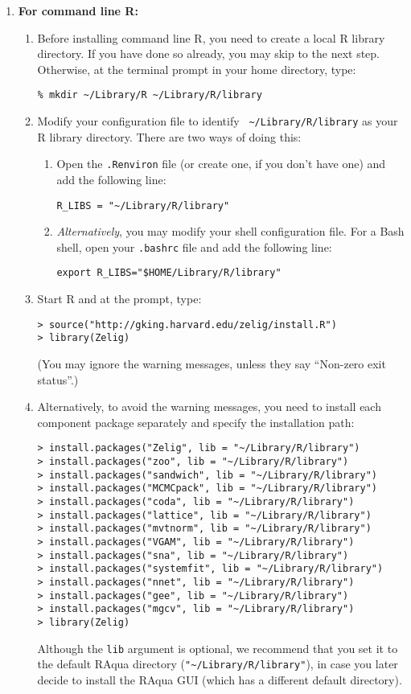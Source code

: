 \documentclass{article}
\begin{document}
\begin{enumerate}
\item {\bf For command line R:} 
  \begin{enumerate}
  \item Before installing command line R, you need to create a local R
    library directory.  If you have done so already, you may skip to
    the next step.  Otherwise, at the terminal prompt in your home
    directory, type:
\begin{verbatim}
% mkdir ~/Library/R ~/Library/R/library
\end{verbatim}
  \item Modify your configuration file to identify {\tt
      \~{}/Library/R/library} as your R library directory.  There are
    two ways of doing this:
    \begin{enumerate}
    \item Open the {\tt .Renviron} file (or create one, if you don't
      have one) and add the following line:
\begin{verbatim} 
R_LIBS = "~/Library/R/library"
\end{verbatim}
    \item {\it Alternatively}, you may modify your shell configuration
      file.  For a Bash shell, open your {\tt .bashrc} file and add
      the following line:
\begin{verbatim}
export R_LIBS="$HOME/Library/R/library"
\end{verbatim} %
      \end{enumerate}
    \item Start R and at the prompt, type:
\begin{verbatim}
> source("http://gking.harvard.edu/zelig/install.R")
> library(Zelig)
\end{verbatim}
(You may ignore the warning messages, unless they say ``Non-zero exit 
status''.)
\item Alternatively, to avoid the warning messages, you need to install 
each component package separately and specify the installation path:
\begin{verbatim}
> install.packages("Zelig", lib = "~/Library/R/library")
> install.packages("zoo", lib = "~/Library/R/library")
> install.packages("sandwich", lib = "~/Library/R/library")
> install.packages("MCMCpack", lib = "~/Library/R/library")
> install.packages("coda", lib = "~/Library/R/library")
> install.packages("lattice", lib = "~/Library/R/library")
> install.packages("mvtnorm", lib = "~/Library/R/library")
> install.packages("VGAM", lib = "~/Library/R/library")
> install.packages("sna", lib = "~/Library/R/library")
> install.packages("systemfit", lib = "~/Library/R/library")
> install.packages("nnet", lib = "~/Library/R/library")
> install.packages("gee", lib = "~/Library/R/library")
> install.packages("mgcv", lib = "~/Library/R/library")
> library(Zelig)
\end{verbatim}
      Although the {\tt lib} argument is optional, we recommend that
      you set it to the default RAqua directory
      (\verb|"~/Library/R/library"|), in case you later decide to
      install the RAqua GUI (which has a different default directory).
      \end{enumerate}
\end{enumerate}
  
\end{document}
